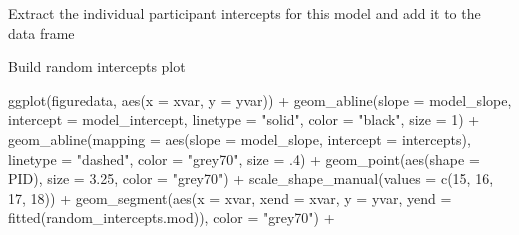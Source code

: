 \documentclass[
]{article}
\newenvironment{Shaded}{\begin{snugshade}}{\end{snugshade}}
\newcommand{\AttributeTok}[1]{\textcolor[rgb]{0.77,0.63,0.00}{#1}}
\newcommand{\DecValTok}[1]{\textcolor[rgb]{0.00,0.00,0.81}{#1}}
\newcommand{\FloatTok}[1]{\textcolor[rgb]{0.00,0.00,0.81}{#1}}
\newcommand{\FunctionTok}[1]{\textcolor[rgb]{0.00,0.00,0.00}{#1}}
\newcommand{\NormalTok}[1]{#1}
\newcommand{\OtherTok}[1]{\textcolor[rgb]{0.56,0.35,0.01}{#1}}
\newcommand{\SpecialCharTok}[1]{\textcolor[rgb]{0.00,0.00,0.00}{#1}}
\newcommand{\StringTok}[1]{\textcolor[rgb]{0.31,0.60,0.02}{#1}}
\begin{document}
Extract the individual participant intercepts for this model and add it
to the data frame

\begin{Shaded}
\end{Shaded}

Build random intercepts plot

\begin{Shaded}
\begin{Highlighting}[]
\FunctionTok{ggplot}\NormalTok{(figuredata, }\FunctionTok{aes}\NormalTok{(}\AttributeTok{x =}\NormalTok{ xvar, }\AttributeTok{y =}\NormalTok{ yvar)) }\SpecialCharTok{+} 
  \FunctionTok{geom\_abline}\NormalTok{(}\AttributeTok{slope =}\NormalTok{ model\_slope, }\AttributeTok{intercept =}\NormalTok{ model\_intercept, }
              \AttributeTok{linetype =} \StringTok{"solid"}\NormalTok{, }\AttributeTok{color =} \StringTok{"black"}\NormalTok{, }\AttributeTok{size =} \DecValTok{1}\NormalTok{) }\SpecialCharTok{+}
  \FunctionTok{geom\_abline}\NormalTok{(}\AttributeTok{mapping =} \FunctionTok{aes}\NormalTok{(}\AttributeTok{slope =}\NormalTok{ model\_slope, }\AttributeTok{intercept =}\NormalTok{ intercepts), }
              \AttributeTok{linetype =} \StringTok{"dashed"}\NormalTok{, }\AttributeTok{color =} \StringTok{"grey70"}\NormalTok{, }\AttributeTok{size =}\NormalTok{ .}\DecValTok{4}\NormalTok{) }\SpecialCharTok{+} 
  \FunctionTok{geom\_point}\NormalTok{(}\FunctionTok{aes}\NormalTok{(}\AttributeTok{shape =}\NormalTok{ PID), }\AttributeTok{size =} \FloatTok{3.25}\NormalTok{, }\AttributeTok{color =} \StringTok{"grey70"}\NormalTok{) }\SpecialCharTok{+} 
  \FunctionTok{scale\_shape\_manual}\NormalTok{(}\AttributeTok{values =} \FunctionTok{c}\NormalTok{(}\DecValTok{15}\NormalTok{, }\DecValTok{16}\NormalTok{, }\DecValTok{17}\NormalTok{, }\DecValTok{18}\NormalTok{)) }\SpecialCharTok{+} 
  \FunctionTok{geom\_segment}\NormalTok{(}\FunctionTok{aes}\NormalTok{(}\AttributeTok{x =}\NormalTok{ xvar, }\AttributeTok{xend =}\NormalTok{ xvar, }
                   \AttributeTok{y =}\NormalTok{ yvar, }\AttributeTok{yend =} \FunctionTok{fitted}\NormalTok{(random\_intercepts.mod)),}
               \AttributeTok{color =} \StringTok{"grey70"}\NormalTok{) }\SpecialCharTok{+}

\end{Highlighting}
\end{Shaded}
\end{document}
